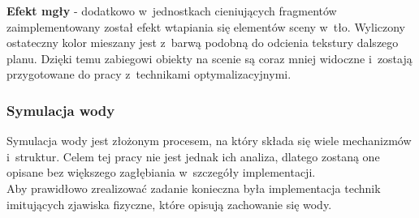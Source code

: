 \documentclass[a4paper,twoside,12pt]{book}
\begin{document}
\textbf{Efekt mgły} - dodatkowo w~jednostkach cieniujących fragmentów zaimplementowany został efekt wtapiania się elementów sceny w~tło. Wyliczony ostateczny kolor mieszany jest z~barwą podobną do odcienia tekstury dalszego planu. Dzięki temu zabiegowi obiekty na scenie są coraz mniej widoczne i~zostają przygotowane do pracy z~technikami optymalizacyjnymi.

\subsubsection{Symulacja wody}
Symulacja wody jest złożonym procesem, na który składa się wiele mechanizmów i~struktur. Celem tej pracy nie jest jednak ich analiza, dlatego zostaną one opisane bez większego zagłębiania w~szczegóły implementacji. \\
Aby prawidłowo zrealizować zadanie konieczna była implementacja technik imitujących zjawiska fizyczne, które opisują zachowanie się wody. 
\end{document}
